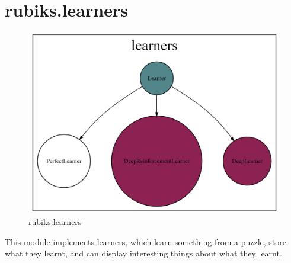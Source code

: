 \section{rubiks.learners}
\label{sec:codelearners}
\begin{figure}[H]
\centering
\includegraphics[scale=0.25]{./Figures/codebaselearners}
\caption[Codebase]{rubiks.learners}
\label{fig:Codebaselearners}
\end{figure}
\label{PLcode}
\label{DRLcode}
This module implements learners, which learn something from a puzzle, store what they learnt, and can display interesting things about what they learnt.


